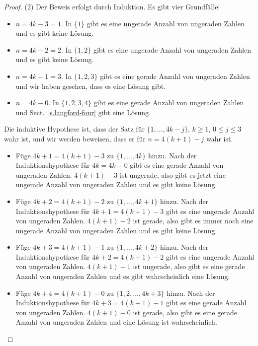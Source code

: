 \begin{proof}
(2)
Der Beweis erfolgt durch Induktion.
Es gibt vier Grundfälle:
\begin{itemize}
\item $n=4k-3=1$. In $\{1\}$ gibt es eine ungerade Anzahl von ungeraden Zahlen und es gibt keine Lösung.
\item $n=4k-2=2$. In $\{1,2\}$ gibt es eine ungerade Anzahl von ungeraden Zahlen und es gibt keine Lösung.
\item $n=4k-1=3$. In $\{1,2,3\}$ gibt es eine gerade Anzahl von ungeraden Zahlen und wir haben gesehen, dass es eine Lösung gibt.
\item $n=4k-0$. In $\{1,2,3,4\}$ gibt es eine gerade Anzahl von ungeraden Zahlen und Sect.~\ref{s.langford-four} gibt eine Lösung.
\end{itemize}

Die induktive Hypothese ist, dass der Satz für $\{1,\ldots,4k-j\}$, $k\ge 1$, $0\leq j\leq 3$ wahr ist, und wir werden beweisen, dass er für $n=4(k+1)-j$ wahr ist.

\begin{itemize}
\item Füge $4k+1=4(k+1)-3$ zu $\{1,\ldots,4k\}$ hinzu. Nach der Induktionshypothese für $4k=4k-0$ gibt es eine gerade Anzahl von ungeraden Zahlen. $4(k+1)-3$ ist ungerade, also gibt es jetzt eine ungerade Anzahl von ungeraden Zahlen und es gibt keine Lösung.
\item Füge $4k+2=4(k+1)-2$ zu $\{1,\ldots,4k+1\}$ hinzu. Nach der Induktionshypothese für $4k+1=4(k+1)-3$ gibt es eine ungerade Anzahl von ungeraden Zahlen. $4(k+1)-2$ ist gerade, also gibt es immer noch eine ungerade Anzahl von ungeraden Zahlen und es gibt keine Lösung.
\item Füge $4k+3=4(k+1)-1$ zu $\{1,\ldots,4k+2\}$ hinzu. Nach der Induktionshypothese für $4k+2=4(k+1)-2$ gibt es eine ungerade Anzahl von ungeraden Zahlen. $4(k+1)-1$ ist ungerade, also gibt es eine gerade Anzahl von ungeraden Zahlen und es gibt wahrscheinlich eine Lösung.
\item Füge $4k+4=4(k+1)-0$ zu $\{1,2,\ldots,4k+3\}$ hinzu. Nach der Induktionshypothese für $4k+3=4(k+1)-1$ gibt es eine gerade Anzahl von ungeraden Zahlen. $4(k+1)-0$ ist gerade, also gibt es eine gerade Anzahl von ungeraden Zahlen und eine Lösung ist wahrscheinlich.
\end{itemize}
\end{proof}


